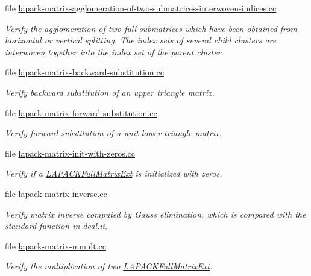 \begin{DoxyCompactItemize}
file \hyperlink{lapack-matrix-agglomeration-of-two-submatrices-interwoven-indices_8cc}{lapack-\/matrix-\/agglomeration-\/of-\/two-\/submatrices-\/interwoven-\/indices.\+cc}
\begin{DoxyCompactList}\small\item\em Verify the agglomeration of two full submatrices which have been obtained from horizontal or vertical splitting. The index sets of several child clusters are interwoven together into the index set of the parent cluster. \end{DoxyCompactList}\item 
file \hyperlink{lapack-matrix-backward-substitution_8cc}{lapack-\/matrix-\/backward-\/substitution.\+cc}
\begin{DoxyCompactList}\small\item\em Verify backward substitution of an upper triangle matrix. \end{DoxyCompactList}\item 
file \hyperlink{lapack-matrix-forward-substitution_8cc}{lapack-\/matrix-\/forward-\/substitution.\+cc}
\begin{DoxyCompactList}\small\item\em Verify forward substitution of a unit lower triangle matrix. \end{DoxyCompactList}\item 
file \hyperlink{lapack-matrix-init-with-zeros_8cc}{lapack-\/matrix-\/init-\/with-\/zeros.\+cc}
\begin{DoxyCompactList}\small\item\em Verify if a \hyperlink{classLAPACKFullMatrixExt}{L\+A\+P\+A\+C\+K\+Full\+Matrix\+Ext} is initialized with zeros. \end{DoxyCompactList}\item 
file \hyperlink{lapack-matrix-inverse_8cc}{lapack-\/matrix-\/inverse.\+cc}
\begin{DoxyCompactList}\small\item\em Verify matrix inverse computed by Gauss elimination, which is compared with the standard function in deal.\+ii. \end{DoxyCompactList}\item 
file \hyperlink{lapack-matrix-mmult_8cc}{lapack-\/matrix-\/mmult.\+cc}
\begin{DoxyCompactList}\small\item\em Verify the multiplication of two {\ttfamily \hyperlink{classLAPACKFullMatrixExt}{L\+A\+P\+A\+C\+K\+Full\+Matrix\+Ext}}. \end{DoxyCompactList}\item 

\end{DoxyCompactItemize}
